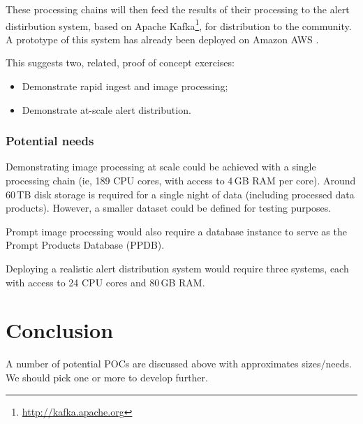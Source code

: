 These processing chains will then feed the results of their processing to the alert distirbution system, based on Apache Kafka\footnote{\url{http://kafka.apache.org}}, for distribution to the community.
A prototype of this system has already been deployed on Amazon AWS .

This suggests two, related, proof of concept exercises:

\begin{itemize}

\item{Demonstrate rapid ingest and image processing;}
\item{Demonstrate at-scale alert distribution.}

\end{itemize}

\subsubsection{Potential needs}

Demonstrating image processing at scale could be achieved with a single processing chain (ie, 189 CPU cores, with access to 4\,GB RAM per core).
Around 60\,TB disk storage is required for a single night of data (including processed data products).
However, a smaller dataset could be defined for testing purposes.

Prompt image processing would also require a database instance to serve as the Prompt Products Database (PPDB).

Deploying a realistic alert distribution system would require three systems, each with access to 24 CPU cores and 80\,GB RAM.

\section{Conclusion}
A number of potential POCs are discussed above with approximates sizes/needs.
We should pick one or more to develop further.
